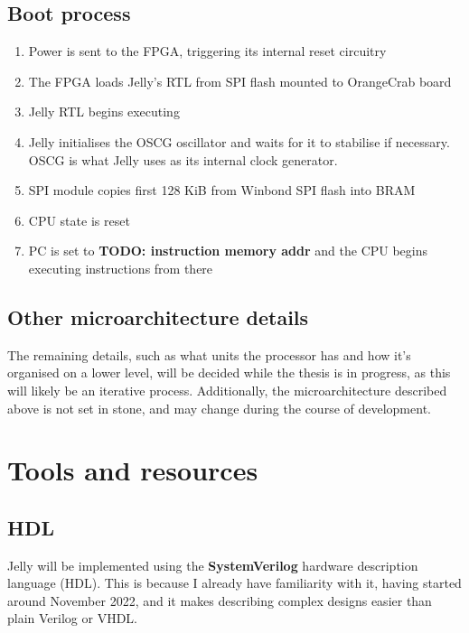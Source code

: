 \documentclass{article}
\begin{document}
\subsection{Boot process}
\begin{enumerate}
	\item Power is sent to the FPGA, triggering its internal reset circuitry
	\item The FPGA loads Jelly's RTL from SPI flash mounted to OrangeCrab board
	\item Jelly RTL begins executing
	\item Jelly initialises the OSCG oscillator and waits for it to stabilise if necessary. OSCG is what Jelly
		uses as its internal clock generator.
	\item SPI module copies first 128 KiB from Winbond SPI flash into BRAM
	\item CPU state is reset
	\item PC is set to \textbf{TODO: instruction memory addr} and the CPU begins executing instructions from there
\end{enumerate}

\subsection{Other microarchitecture details}
The remaining details, such as what units the processor has and how it's organised on a lower level, will be
decided while the thesis is in progress, as this will likely be an iterative process. Additionally, the 
microarchitecture described above is not set in stone, and may change during the course of development.

\section{Tools and resources}
\subsection{HDL}
Jelly will be implemented using the \textbf{SystemVerilog} hardware description language (HDL). This is
because I already have familiarity with it, having started around November 2022, and it makes describing
complex designs easier than plain Verilog or VHDL.
\end{document}

